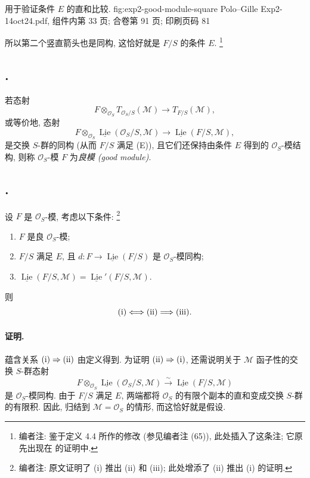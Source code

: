   {用于验证条件 \(E\) 的直和比较.}
  {fig:exp2-good-module-square}
  {Polo--Gille Exp2-14oct24.pdf, 组件内第 33 页; 合卷第 91 页; 印刷页码 81}

所以第二个竖直箭头也是同构, 这恰好就是 \(F/S\) 的条件 \(E\).
\footnote{编者注: 鉴于定义 4.4 所作的修改 (参见编者注 (65)),
此处插入了这条注; 它原先出现在  的证明中.}

\subsection*{.}
若态射
\[
 F\otimes_{\mathcal O_S}T_{\mathcal O_S/S}(\mathcal M)
 \longrightarrow T_{F/S}(\mathcal M),
\]
或等价地, 态射
\[
 F\otimes_{\mathcal O_S}
 \underline{\operatorname{Lie}}(\mathcal O_S/S,\mathcal M)
 \longrightarrow
 \underline{\operatorname{Lie}}(F/S,\mathcal M),
\]
是交换 \(S\)-群的同构 (从而 \(F/S\) 满足 (E)), 且它们还保持由条件 \(E\)
得到的 \(\mathcal O_S\)-模结构, 则称 \(\mathcal O_S\)-模 \(F\)
为\emph{良模 (good module)}.

\subsection*{.}
设 \(F\) 是 \(\mathcal O_S\)-模, 考虑以下条件:
\footnote{编者注: 原文证明了 (i) 推出 (ii) 和 (iii);
此处增添了 (ii) 推出 (i) 的证明.}
\begin{enumerate}
  \item[(i)] \(F\) 是良 \(\mathcal O_S\)-模;
  \item[(ii)] \(F/S\) 满足 \(E\), 且
    \(d:F\to\underline{\operatorname{Lie}}(F/S)\) 是 \(\mathcal O_S\)-模同构;
  \item[(iii)]
    \(\underline{\operatorname{Lie}}(F/S,\mathcal M)
      =\underline{\operatorname{Lie}}'(F/S,\mathcal M)\).
\end{enumerate}
则
\[
  \textup{(i)}\Longleftrightarrow\textup{(ii)}
  \Longrightarrow\textup{(iii)}.
\]

\paragraph{证明.}
蕴含关系 \(\textup{(i)}\Rightarrow\textup{(ii)}\) 由定义得到.
为证明 \(\textup{(ii)}\Rightarrow\textup{(i)}\), 还需说明关于 \(\mathcal M\)
函子性的交换 \(S\)-群态射
\[
 F\otimes_{\mathcal O_S}
 \underline{\operatorname{Lie}}(\mathcal O_S/S,\mathcal M)
 \xrightarrow{\sim}
 \underline{\operatorname{Lie}}(F/S,\mathcal M)
\]
是 \(\mathcal O_S\)-模同构. 由于 \(F/S\) 满足 \(E\),
两端都将 \(\mathcal O_S\) 的有限个副本的直和变成交换 \(S\)-群的有限积.
因此, 归结到 \(\mathcal M=\mathcal O_S\) 的情形, 而这恰好就是假设.

